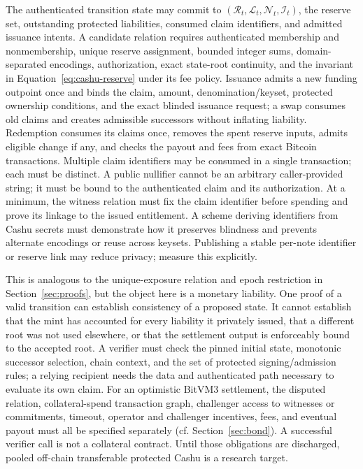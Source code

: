 The authenticated transition state may commit to $(\mathcal R_t,\mathcal L_t,\mathcal N_t,\mathcal I_t)$, the reserve set, outstanding protected liabilities, consumed claim identifiers, and admitted issuance intents. A candidate relation requires authenticated membership and nonmembership, unique reserve assignment, bounded integer sums, domain-separated encodings, authorization, exact state-root continuity, and the invariant in Equation~\eqref{eq:cashu-reserve} under its fee policy. Issuance admits a new funding outpoint once and binds the claim, amount, denomination/keyset, protected ownership conditions, and the exact blinded issuance request; a swap consumes old claims and creates admissible successors without inflating liability. Redemption consumes its claims once, removes the spent reserve inputs, admits eligible change if any, and checks the payout and fees from exact Bitcoin transactions. Multiple claim identifiers may be consumed in a single transaction; each must be distinct. A public nullifier cannot be an arbitrary caller-provided string; it must be bound to the authenticated claim and its authorization. At a minimum, the witness relation must fix the claim identifier before spending and prove its linkage to the issued entitlement. A scheme deriving identifiers from Cashu secrets must demonstrate how it preserves blindness and prevents alternate encodings or reuse across keysets. Publishing a stable per-note identifier or reserve link may reduce privacy; measure this explicitly.

This is analogous to the unique-exposure relation and epoch restriction in Section~\ref{sec:proofs}, but the object here is a monetary liability. One proof of a valid transition can establish consistency of a proposed state. It cannot establish that the mint has accounted for every liability it privately issued, that a different root was not used elsewhere, or that the settlement output is enforceably bound to the accepted root. A verifier must check the pinned initial state, monotonic successor selection, chain context, and the set of protected signing/admission rules; a relying recipient needs the data and authenticated path necessary to evaluate its own claim. For an optimistic BitVM3 settlement, the disputed relation, collateral-spend transaction graph, challenger access to witnesses or commitments, timeout, operator and challenger incentives, fees, and eventual payout must all be specified separately (cf. Section~\ref{sec:bond}). A successful verifier call is not a collateral contract. Until those obligations are discharged, pooled off-chain transferable protected Cashu is a research target.

